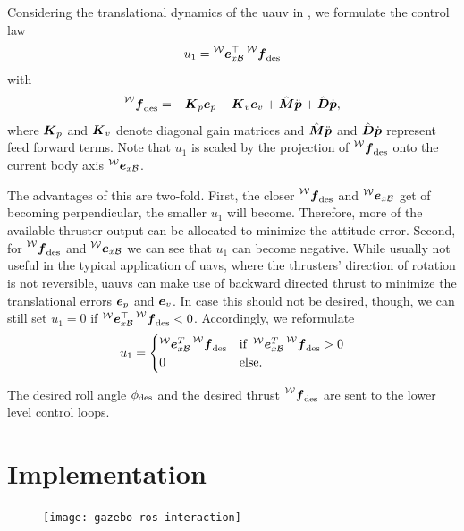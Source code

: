 Considering the translational dynamics of the \ac{uauv} in , we formulate the control law
\begin{equation}
	\label{eq:translational-control-law-short}
	u_1 = \exbodyinworld^\top \thrustdesiredworld
\end{equation}
with
\begin{equation}
	\thrustdesiredworld =
	-\Kb_p \eb_p
	- \Kb_v \eb_v
	+ \hat{\bm{M}} \pbpp
	+ \hat{\bm{D}} \pbp
	,
\end{equation}
where $\mbox{$\bm{K}$}_p$ and $\mbox{$\bm{K}$}_v$ denote diagonal gain matrices and $\hat{\bm{M}} \mbox{$\ddot{\bm{p}}$}$ and $\hat{\bm{D}}\mbox{$\dot{\bm{p}}$}$ represent feed forward terms. Note that $u_1$ is scaled by the projection of $\thrustdesiredworld$ onto the current body axis $\prescript{\mathcal{W}}{}{\mbox{$\bm{e}$}}_{x\mathcal{B}}$.

The advantages of this are two-fold. First, the closer $\thrustdesiredworld$ and $\prescript{\mathcal{W}}{}{\mbox{$\bm{e}$}}_{x\mathcal{B}}$ get of becoming perpendicular, the smaller $u_1$ will become. Therefore, more of the available thruster output can be allocated to minimize the attitude error. Second, for $\thrustdesiredworld$ and $\prescript{\mathcal{W}}{}{\mbox{$\bm{e}$}}_{x\mathcal{B}}$ we can see that $u_1$ can become negative. While usually not useful in the typical application of \acp{uav}, where the thrusters' direction of rotation is not reversible, \acp{uauv} can make use of backward directed thrust to minimize the translational errors $\mbox{$\bm{e}$}_p$ and $\mbox{$\bm{e}$}_v$. In case this should not be desired, though, we can still set $u_1=0$ if $\exbodyinworld^\top \thrustdesiredworld < 0$. Accordingly, we reformulate 
\begin{equation}
	u_1 = 
	\begin{cases}
		\exbodyinworld^T \thrustdesiredworld & \text{if } \exbodyinworld^T \thrustdesiredworld > 0 \\
		0 & \text{else.}
	\end{cases}
\end{equation}

The desired roll angle $\phi_{\text{des}}$ and the desired thrust $\thrustdesiredworld$ are sent to the lower level control loops.




\section{Implementation}
\begin{figure}
	\centering
	\texttt{[image: gazebo-ros-interaction]}
\end{figure}

